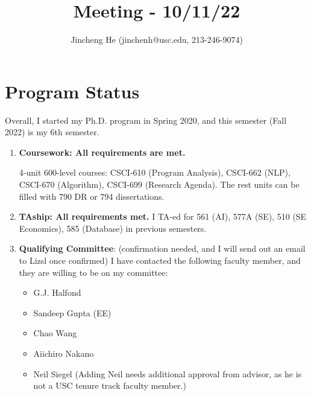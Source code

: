 \documentclass{article}
\title{Meeting - 10/11/22}
\author{Jincheng He (jinchenh@usc.edu, 213-246-9074)}
\date{}
\begin{document}
\maketitle

\section*{Program Status}
Overall, I started my Ph.D. program in Spring 2020, and this semester (Fall 2022) is my 6th semester. 
\begin{enumerate}

    \item \textbf{Coursework: All requirements are met.} 

    4-unit 600-level courses: CSCI-610 (Program Analysis), CSCI-662 (NLP), CSCI-670 (Algorithm), CSCI-699 (Research Agenda).
    The rest units can be filled with 790 DR or 794 dissertations.

    \item \textbf{TAship: All requirements met.} I TA-ed for 561 (AI), 577A (SE), 510 (SE Economics), 585 (Database) in previous semesters.

    \item \textbf{Qualifying Committee}: {\color{BrickRed}(confirmation needed, and I will send out an email to Lizsl once confirmed)} I have contacted the following faculty member, and they are willing to be on my committee:

    \begin{itemize}
        \item G.J. Halfond
        \item Sandeep Gupta (EE)
        \item Chao Wang
        \item Aiichiro Nakano 
        \item Neil Siegel (Adding Neil needs additional approval from advisor, as he is not a USC tenure track faculty member.)
    \end{itemize}
\end{enumerate}
\end{document}

